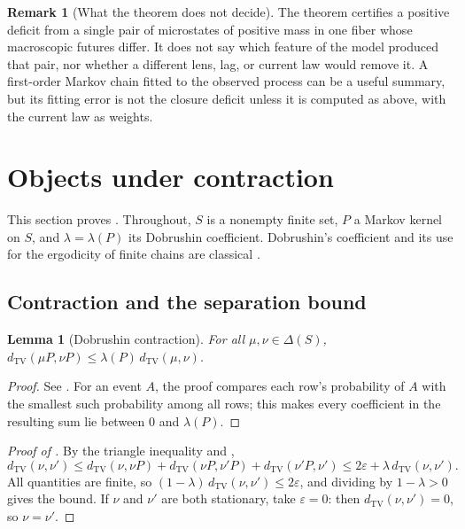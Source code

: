 \documentclass[11pt]{article}
\newtheorem{lemma}{Lemma}[section]
\theoremstyle{definition}
\newtheorem{remark}{Remark}[section]
\newcommand{\1}{\mathbf{1}}
\newcommand{\thmNGObjectContractive}{\Cref{thm:NG_OBJECT_CONTRACTIVE}}
\newcommand{\dTV}{d_{\mathrm{TV}}}
\begin{document}
\begin{remark}[What the theorem does not decide]
The theorem certifies a positive deficit from a single pair of microstates of positive mass in one fiber whose macroscopic futures differ.
It does not say which feature of the model produced that pair, nor whether a different lens, lag, or current law would remove it.
A first-order Markov chain fitted to the observed process can be a useful summary, but its fitting error is not the closure deficit unless it is computed as above, with the current law as weights.
\end{remark}
 \section{Objects under contraction}\label{sec:objecthood}

This section proves \thmNGObjectContractive.
Throughout, $S$ is a nonempty finite set, $P$ a Markov kernel on $S$, and $\lambda=\lambda(P)$ its Dobrushin coefficient.
Dobrushin's coefficient and its use for the ergodicity of finite chains are classical \citep{Dobrushin1956,Seneta2006}.

\subsection{Contraction and the separation bound}

\begin{lemma}[Dobrushin contraction]\label{lem:objecthood_dobrushin}
For all $\mu,\nu\in\Delta(S)$, $\dTV(\mu P,\nu P)\le\lambda(P)\,\dTV(\mu,\nu)$.
\end{lemma}

\begin{proof}
See .
For an event $A$, the proof compares each row's probability of $A$ with the smallest such probability among all rows; this makes every coefficient in the resulting sum lie between $0$ and $\lambda(P)$.
\end{proof}

\begin{proof}[Proof of ]
By the triangle inequality and ,
\[
  \dTV(\nu,\nu')\le\dTV(\nu,\nu P)+\dTV(\nu P,\nu'P)+\dTV(\nu'P,\nu')\le 2\varepsilon+\lambda\,\dTV(\nu,\nu').
\]
All quantities are finite, so $(1-\lambda)\,\dTV(\nu,\nu')\le 2\varepsilon$, and dividing by $1-\lambda>0$ gives the bound.
If $\nu$ and $\nu'$ are both stationary, take $\varepsilon=0$: then $\dTV(\nu,\nu')=0$, so $\nu=\nu'$.
\end{proof}
\end{document}
